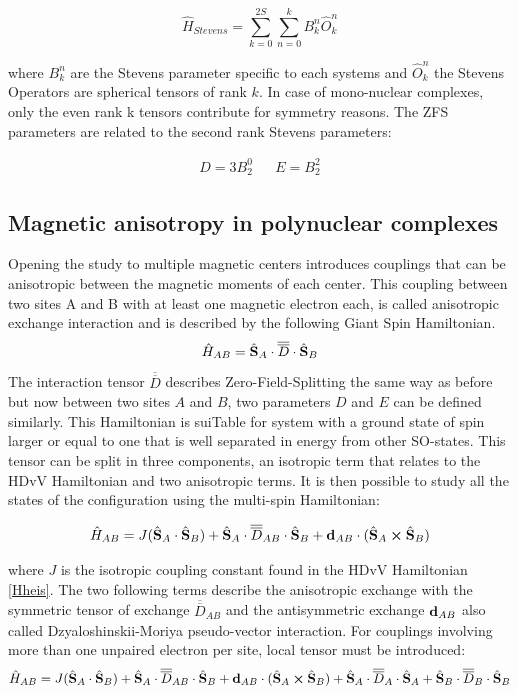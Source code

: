 \documentclass[12pt]{report}
\numberwithin{equation}{section}
\begin{document}
\begin{equation}
    \hat{H}_{Stevens}=\sum_{k=0}^{2S}\sum_{n=0}^{k}B_k^n\hat{O}_k^n
\end{equation}

where $B_k^n$ are the Stevens parameter specific to each systems and $\hat{O}_k^n$ the Stevens Operators are spherical tensors of rank $k$.
In case of mono-nuclear complexes, only the even rank k tensors contribute for symmetry reasons. 
The ZFS parameters are related to the second rank Stevens parameters:

\begin{align}
    D=3B_2^0 && E=B_2^2
\end{align}


\subsection{Magnetic anisotropy in polynuclear complexes}
Opening the study to multiple magnetic centers introduces couplings that can be anisotropic between the magnetic moments of each center. 
This coupling between two sites A and B with at least one magnetic electron each, is called anisotropic exchange interaction and is described by the following Giant Spin Hamiltonian.
\begin{equation}
    \hat{H}_{AB}=\hat{\vb S}_A\cdot \overline{\overline{D}} \cdot \hat{\vb S}_B
\end{equation}
The interaction tensor $\overline{\overline{D}}$ describes Zero-Field-Splitting the same way as before but now between two sites $A$ and $B$, two parameters $D$ and $E$ can be defined similarly. 
This Hamiltonian is suiTable for system with a ground state of spin larger or equal to one that is well separated in energy from other SO-states.
This tensor can be split in three components, an isotropic term that relates to the HDvV Hamiltonian and two anisotropic terms.
It is then possible to study all the states of the configuration using the multi-spin Hamiltonian:

\begin{equation}
    \hat{H}_{AB}=J(\hat{\vb S}_A \cdot \hat{\vb S}_B) + \hat{\vb S}_A \cdot\overline{\overline{D}}_{AB} \cdot \hat{\vb S}_B + \vb{d}_{AB} \cdot (\hat{\vb S}_A \cross \hat{\vb S}_B)
\end{equation}

\noindent where $J$ is the isotropic coupling constant found in the HDvV Hamiltonian \ref{Hheis}.
The two following terms describe the anisotropic exchange with the symmetric tensor of exchange $\overline{\overline{D}}_{AB}$ and the antisymmetric exchange $\vb{d}_{AB}$ also called Dzyaloshinskii-Moriya pseudo-vector interaction.
For couplings involving more than one unpaired electron per site, local tensor must be introduced:
\begin{equation}\label{HMS}
    \hat{H}_{AB}=J(\hat{\vb S}_A \cdot \hat{\vb S}_B) + \hat{\vb S}_A \cdot\overline{\overline{D}}_{AB} \cdot \hat{\vb S}_B + \vb{d}_{AB} \cdot (\hat{\vb S}_A \cross \hat{\vb S}_B) +\hat{\vb S}_A \cdot\overline{\overline{D}}_{A} \cdot \hat{\vb S}_A +\hat{\vb S}_B \cdot\overline{\overline{D}}_{B} \cdot \hat{\vb S}_B
\end{equation}
\end{document}
